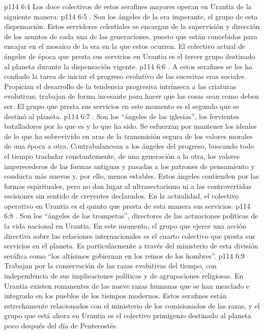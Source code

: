 \vs p114 6:4 Los doce colectivos de estos serafines mayores operan en Urantia de la siguiente manera:
\vs p114 6:5 . Son los ángeles de la era imperante, el grupo de esta dispensación. Estos servidores celestiales se encargan de la supervisión y dirección de los asuntos de cada una de las generaciones, puesto que están concebidos para encajar en el mosaico de la era en la que estos ocurren. El colectivo actual de ángeles de época que presta sus servicios en Urantia es el tercer grupo destinado al planeta durante la dispensación vigente.
\vs p114 6:6 . A estos serafines se les ha confiado la tarea de iniciar el progreso evolutivo de las sucesivas eras sociales. Propician el desarrollo de la tendencia progresiva intrínseca a las criaturas evolutivas; trabajan de forma incesante para hacer que las cosas sean como deben ser. El grupo que presta sus servicios en este momento es el segundo que se destinó al planeta.
\vs p114 6:7 . Son los “ángeles de las iglesias”, los fervientes batalladores por lo que es y lo que ha sido. Se esfuerzan por mantener los ideales de lo que ha sobrevivido en aras de la transmisión segura de los valores morales de una época a otra. Contrabalancean a los ángeles del progreso, buscando todo el tiempo trasladar constantemente, de una generación a la otra, los valores imperecederos de las formas antiguas y pasadas a los patrones de pensamiento y conducta más nuevos y, por ello, menos estables. Estos ángeles contienden por las formas espirituales, pero no dan lugar al ultrasectarismo ni a las controvertidas escisiones sin sentido de creyentes declarados. En la actualidad, el colectivo operativo en Urantia es el quinto que presta de esta manera sus servicios.
\vs p114 6:8 . Son los “ángeles de las trompetas”, directores de las actuaciones políticas de la vida nacional en Urantia. En este momento, el grupo que ejerce una acción directiva sobre las relaciones internacionales es el cuarto colectivo que presta sus servicios en el planeta. Es particularmente a través del ministerio de esta división seráfica como “los altísimos gobiernan en los reinos de los hombres”.
\vs p114 6:9  Trabajan por la conservación de las razas evolutivas del tiempo, con independencia de sus implicaciones políticas y de agrupaciones religiosas. En Urantia existen remanentes de las nueve razas humanas que se han mezclado e integrado en los pueblos de los tiempos modernos. Estos serafines están estrechamente relacionados con el ministerio de los comisionados de las razas, y el grupo que está ahora en Urantia es el colectivo primigenio destinado al planeta poco después del día de Pentecostés.
